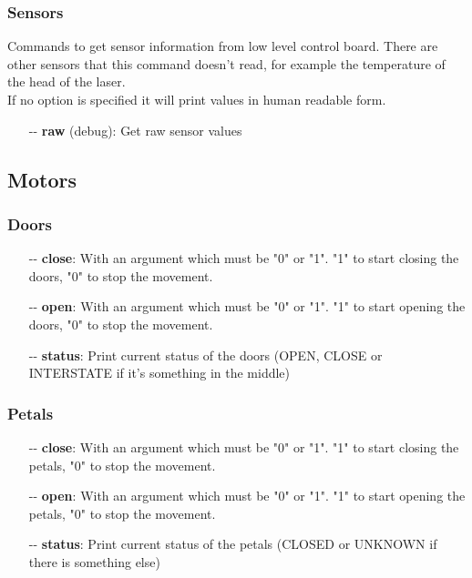 \documentclass[letterpaper, 10 pt]{article}
\begin{document}
\subsubsection{Sensors}
Commands to get sensor information from low level control board. There are other sensors that this command doesn't read, for example the temperature of the head of the laser.\\
If no option is specified it will print values in human readable form.
\begin{itemize}
	\item[-{}-] \textbf{raw} (debug): Get raw sensor values
\end{itemize}

\subsection{Motors}
\subsubsection{Doors}
\begin{itemize}
	\item[-{}-] \textbf{close}: With an argument which must be "0" or "1". "1" to start closing the doors, "0" to stop the movement.
	\item[-{}-] \textbf{open}: With an argument which must be "0" or "1". "1" to start opening the doors, "0" to stop the movement.
	\item[-{}-] \textbf{status}: Print current status of the doors (OPEN, CLOSE or INTERSTATE if it's something in the middle)
\end{itemize}
\subsubsection{Petals}
\begin{itemize}
	\item[-{}-] \textbf{close}: With an argument which must be "0" or "1". "1" to start closing the petals, "0" to stop the movement.
	\item[-{}-] \textbf{open}: With an argument which must be "0" or "1". "1" to start opening the petals, "0" to stop the movement.
	\item[-{}-] \textbf{status}: Print current status of the petals (CLOSED or UNKNOWN if there is something else)
\end{itemize}
\end{document}
